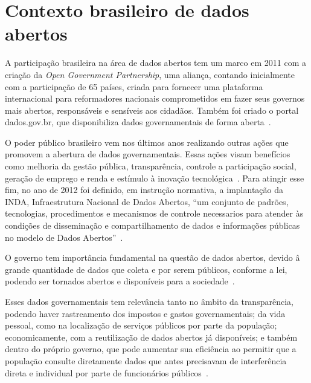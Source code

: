 \section{Contexto brasileiro de dados abertos}
A participação brasileira na área de dados abertos tem um marco em 2011 com a criação da \emph{Open Government Partnership}, uma aliança, contando inicialmente com a participação de 65 países, criada para fornecer uma plataforma internacional para reformadores nacionais comprometidos em fazer seus governos mais abertos, responsáveis e sensíveis aos cidadãos. Também foi criado o portal dados.gov.br, que disponibiliza dados governamentais de forma aberta~\cite{seijiconectados}.

O poder público brasileiro vem nos últimos anos realizando outras ações que promovem a abertura de dados governamentais. Essas ações visam benefícios como melhoria da gestão pública, transparência, controle a participação social, geração de emprego e renda e estímulo à inovação tecnológica~\cite{tcu}. Para atingir esse fim, no ano de 2012 foi definido, em instrução normativa, a implantação da INDA, Infraestrutura Nacional de Dados Abertos, \enquote{um conjunto de padrões, tecnologias, procedimentos e mecanismos de controle necessarios para atender às condições de disseminação e compartilhamento de dados e informações públicas no modelo de Dados Abertos}~\cite{inda}.  

O governo tem importância fundamental na questão de dados abertos, devido â grande quantidade de dados que coleta e por serem públicos, conforme a lei, podendo ser tornados abertos e disponíveis para a sociedade~\cite{openknowledge}.

Esses dados governamentais tem relevância tanto no âmbito da transparência, podendo haver rastreamento dos impostos e gastos governamentais; da vida pessoal, como na localização de serviços públicos por parte da população; economicamente, com a reutilização de dados abertos já disponíveis; e também dentro do próprio governo, que pode aumentar sua eficiência ao permitir que a população consulte diretamente dados que antes precisavam de interferência direta e individual por parte de funcionários públicos~\cite{openknowledge}.









